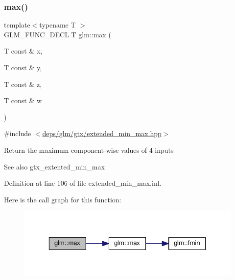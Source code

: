 \subsubsection{\texorpdfstring{max()}{max()}\hspace{0.1cm}{\footnotesize\ttfamily [4/6]}}
{\footnotesize\ttfamily template$<$typename T $>$ \\
G\+L\+M\+\_\+\+F\+U\+N\+C\+\_\+\+D\+E\+CL T glm\+::max (\begin{DoxyParamCaption}\item[{T const \&}]{x,  }\item[{T const \&}]{y,  }\item[{T const \&}]{z,  }\item[{T const \&}]{w }\end{DoxyParamCaption})}



{\ttfamily \#include $<$\hyperlink{extended__min__max_8hpp}{deps/glm/gtx/extended\+\_\+min\+\_\+max.\+hpp}$>$}

Return the maximum component-\/wise values of 4 inputs \begin{DoxySeeAlso}{See also}
gtx\+\_\+extented\+\_\+min\+\_\+max 
\end{DoxySeeAlso}


Definition at line 106 of file extended\+\_\+min\+\_\+max.\+inl.

Here is the call graph for this function\+:
\nopagebreak
\begin{figure}[H]
\begin{center}
\leavevmode
\includegraphics[width=323pt]{df/d72/group__gtx__extended__min__max_ga78e04a0cef1c4863fcae1a2130500d87_cgraph}
\end{center}
\end{figure}
\mbox{\label{group__gtx__extended__min__max_ga7cca8b53cfda402040494cdf40fbdf4a}} 
